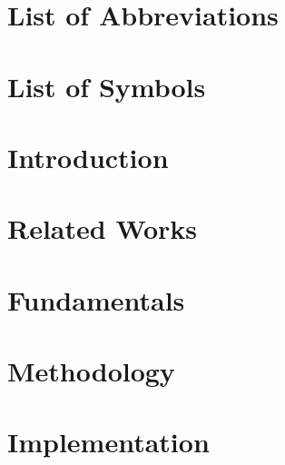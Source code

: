 \documentclass[fleqn]{report}
\author[1]{Giriraj Sukumar Pawar}
\begin{document}




\newpage


\newpage

\tableofcontents
\newpage

\listoffigures
\newpage

\listoftables
\newpage

\listofalgorithms
\newpage

\chapter*{List of Abbreviations}

\newpage

\chapter*{List of Symbols}

\newpage

\chapter{Introduction}
    \label{introduction}
    
\newpage

\chapter{Related Works}
    \label{relatedworks}
    
\newpage    


\chapter{Fundamentals}
    \label{fundamentals}
    
\newpage

\chapter{Methodology}
    \label{methodology}
    
\newpage

\chapter{Implementation}
    \label{implementation}
    
\newpage
\end{document}
